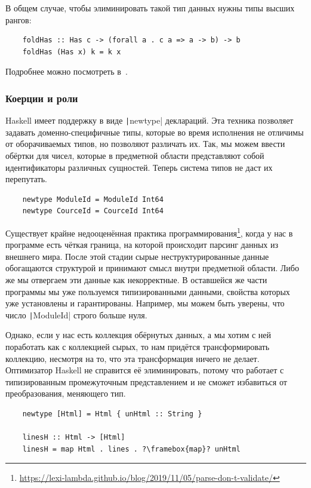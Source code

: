 В общем случае, чтобы элиминировать такой тип данных нужны типы высших рангов:
\begin{verbatim}
    foldHas :: Has c -> (forall a . c a => a -> b) -> b
    foldHas (Has x) k = k x
\end{verbatim}

Подробнее можно посмотреть в~\cite[глава 7]{maguire-types}.

\subsubsection{Коерции и роли} \label{subsubsec:coercions}

Haskell имеет поддержку  в виде \texttt|newtype| деклараций.
Эта техника позволяет задавать доменно-специфичные типы, которые во время исполнения не отличимы от оборачиваемых типов, но позволяют различать их.
Так, мы можем ввести обёртки для чисел, которые в предметной области представляют собой идентификаторы различных сущностей.
Теперь система типов не даст их перепутать.
\begin{verbatim}
    newtype ModuleId = ModuleId Int64
    newtype CourceId = CourceId Int64
\end{verbatim}

Существует крайне недооценённая практика программирования\footnote{\url{https://lexi-lambda.github.io/blog/2019/11/05/parse-don-t-validate/}}, когда у нас в программе есть чёткая граница, на которой происходит парсинг данных из внешнего мира.
После этой стадии сырые неструктурированные данные обогащаются структурой и принимают смысл внутри предметной области.
Либо же мы отвергаем эти данные как некорректные.
В оставшейся же части программы мы уже пользуемся типизированными данными, свойства которых уже установлены и гарантированы.
Например, мы можем быть уверены, что число \texttt|ModuleId| строго больше нуля.

Однако, если у нас есть коллекция обёрнутых данных, а мы хотим с ней поработать как с коллекцией сырых, то нам придётся трансформировать коллекцию, несмотря на то, что эта трансформация ничего не делает.
Оптимизатор Haskell не справится её элиминировать, потому что работает с типизированным промежуточным представлением и не сможет избавиться от преобразования, меняющего тип.
\begin{verbatim}
    newtype [Html] = Html { unHtml :: String }

    linesH :: Html -> [Html]
    linesH = map Html . lines . ?\framebox{map}? unHtml
\end{verbatim}

